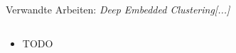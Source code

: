 \documentclass[9pt]{beamer}
\begin{document}
\begin{frame}{Verwandte Arbeiten: \textit{Deep Embedded Clustering[...]}}
	\begin{columns}
		\begin{column}{.5\textwidth}
			\begin{itemize}
				\item TODO
			\end{itemize}
		\end{column}
		\begin{column}{.5\textwidth}
			\begin{figure}
				
			\end{figure}
		\end{column}
	\end{columns}
\end{frame}
\end{document}
